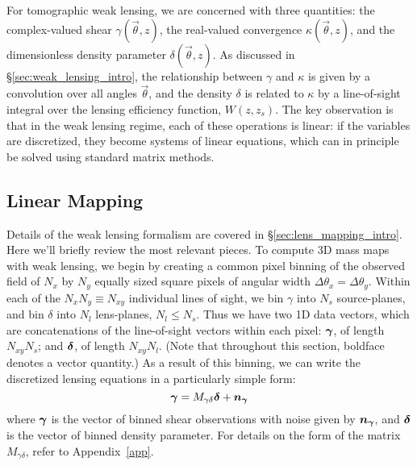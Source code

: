 For tomographic weak lensing, we are concerned with three quantities:  the 
complex-valued shear $\gamma(\vec\theta,z)$, the real-valued convergence
$\kappa(\vec\theta,z)$, and the dimensionless density parameter 
$\delta(\vec\theta,z)$.  As discussed in \S\ref{sec:weak_lensing_intro},
the relationship between $\gamma$ and $\kappa$ is given
by a convolution over all angles $\vec\theta$, and the density $\delta$ is
related to $\kappa$ by a line-of-sight integral over the lensing efficiency
function, $W(z,z_s)$.  The key observation is that in the weak lensing regime,
each of these operations is linear: if the variables are discretized, 
they become systems of linear equations, 
which can in principle be solved using standard matrix methods.

\subsection{Linear Mapping}
\label{LinearMapping}

Details of the weak lensing formalism are covered in
\S\ref{sec:lens_mapping_intro}.  Here we'll briefly review the
most relevant pieces.
To compute 3D mass maps with weak lensing, we begin by
creating a common pixel binning of the observed field of 
$N_x$ by $N_y$ equally sized square pixels
of angular width $\Delta\theta_x = \Delta\theta_y$.  
Within each of the $N_x N_y \equiv N_{xy}$ individual
lines of sight, we bin $\gamma$ into $N_s$ source-planes,
and bin $\delta$ into $N_l$ lens-planes, $N_l \le N_s$.  
Thus we have two 1D data vectors, which are concatenations of
the line-of-sight vectors within each pixel:
 $\boldsymbol{\gamma}$, of length $N_{xy} N_s$; 
and $\boldsymbol{\delta}$, of length $N_{xy} N_l$.  
(Note that throughout this section, boldface denotes a vector quantity.)  
As a result of this binning, we can write the discretized lensing 
equations in a particularly simple form:
\begin{equation}
  \label{M_gd}
  \boldsymbol{\gamma} = M_{\gamma\delta}\boldsymbol{\delta} + \boldsymbol{n_\gamma}
\end{equation}
where $\boldsymbol{\gamma}$ is the vector of binned shear observations with noise
given by $\boldsymbol{n_\gamma}$, and $\boldsymbol{\delta}$ is the vector 
of binned density parameter.  For details on the form of 
the matrix $M_{\gamma\delta}$, refer to Appendix~\ref{app}.

